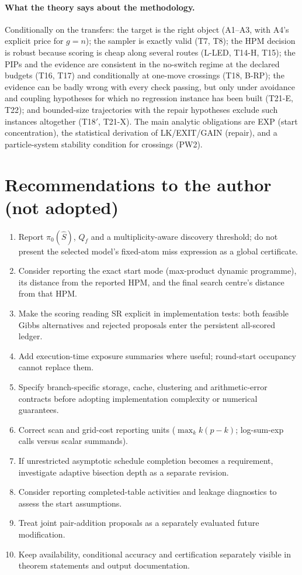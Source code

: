 \documentclass[11pt,a4paper]{article}
\theoremstyle{plain}
\theoremstyle{definition}
\theoremstyle{remark}
\newcommand{\Shat}{\widehat S}
\newcommand{\pizero}{\pi_0}
\newcommand{\Qf}{Q_{f}}
\begin{document}
\paragraph{What the theory says about the methodology.} Conditionally on the transfers: the target is the right object (A1--A3, with A4's explicit price for $g=n$); the sampler is exactly valid (T7, T8); the HPM decision is robust because scoring is cheap along several routes (L-LED, T14-H, T15); the PIPs and the evidence are consistent in the no-switch regime at the declared budgets (T16, T17) and conditionally at one-move crossings (T18, B-RP); the evidence can be badly wrong with every check passing, but only under avoidance and coupling hypotheses for which no regression instance has been built (T21-E, T22); and bounded-size trajectories with the repair hypotheses exclude such instances altogether (T18$'$, T21-X). The main analytic obligations are EXP (start concentration), the statistical derivation of LK/EXIT/GAIN (repair), and a particle-system stability condition for crossings (PW2).

\section{Recommendations to the author (not adopted)}\label{sec:recs}
\begin{enumerate}
\item Report $\pizero(\Shat)$, $\Qf$ and a multiplicity-aware discovery threshold; do not present the selected model's fixed-atom miss expression as a global certificate.
\item Consider reporting the exact start mode (max-product dynamic programme), its distance from the reported HPM, and the final search centre's distance from that HPM.
\item Make the scoring reading SR explicit in implementation tests: both feasible Gibbs alternatives and rejected proposals enter the persistent all-scored ledger.
\item Add execution-time exposure summaries where useful; round-start occupancy cannot replace them.
\item Specify branch-specific storage, cache, clustering and arithmetic-error contracts before adopting implementation complexity or numerical guarantees.
\item Correct scan and grid-cost reporting units ($\max_k k(p-k)$; log-sum-exp calls versus scalar summands).
\item If unrestricted asymptotic schedule completion becomes a requirement, investigate adaptive bisection depth as a separate revision.
\item Consider reporting completed-table activities and leakage diagnostics to assess the start assumptions.
\item Treat joint pair-addition proposals as a separately evaluated future modification.
\item Keep availability, conditional accuracy and certification separately visible in theorem statements and output documentation.
\end{enumerate}
\end{document}
